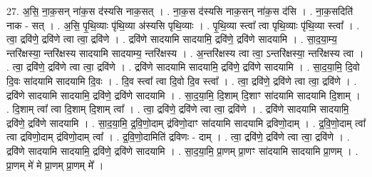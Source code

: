 \documentclass[17pt]{extarticle}
\begin{document}
27. अ॒सि॒ ना॒क॒सन् ना॑क॒स द॑स्यसि नाक॒सत् । . ना॒क॒स द॑स्यसि नाक॒सन् ना॑क॒स द॑सि । . ना॒क॒सदिति॑ नाक - सत् । . अ॒सि॒ पृ॒थि॒व्याः पृ॑थि॒व्या अ॑स्यसि पृथि॒व्याः । . पृ॒थि॒व्या स्त्वा᳚ त्वा पृथि॒व्याः पृ॑थि॒व्या स्त्वा᳚ । . त्वा॒ द्रवि॑णे॒ द्रवि॑णे त्वा त्वा॒ द्रवि॑णे । . द्रवि॑णे सादयामि सादयामि॒ द्रवि॑णे॒ द्रवि॑णे सादयामि । . सा॒द॒या॒म्य॒ न्तरि॑क्षस्या॒ न्तरि॑क्षस्य सादयामि सादयाम्य॒ न्तरि॑क्षस्य । . अ॒न्तरि॑क्षस्य त्वा त्वा॒ ऽन्तरि॑क्षस्या॒ न्तरि॑क्षस्य त्वा । . त्वा॒ द्रवि॑णे॒ द्रवि॑णे त्वा त्वा॒ द्रवि॑णे । . द्रवि॑णे सादयामि सादयामि॒ द्रवि॑णे॒ द्रवि॑णे सादयामि । . सा॒द॒या॒मि॒ दि॒वो दि॒वः सा॑दयामि सादयामि दि॒वः । . दि॒व स्त्वा᳚ त्वा दि॒वो दि॒व स्त्वा᳚ । . त्वा॒ द्रवि॑णे॒ द्रवि॑णे त्वा त्वा॒ द्रवि॑णे । . द्रवि॑णे सादयामि सादयामि॒ द्रवि॑णे॒ द्रवि॑णे सादयामि । . सा॒द॒या॒मि॒ दि॒शाम् दि॒शाꣳ सा॑दयामि सादयामि दि॒शाम् । . दि॒शाम् त्वा᳚ त्वा दि॒शाम् दि॒शाम् त्वा᳚ । . त्वा॒ द्रवि॑णे॒ द्रवि॑णे त्वा त्वा॒ द्रवि॑णे । . द्रवि॑णे सादयामि सादयामि॒ द्रवि॑णे॒ द्रवि॑णे सादयामि । . सा॒द॒या॒मि॒ द्र॒वि॒णो॒दाम् द्र॑विणो॒दाꣳ सा॑दयामि सादयामि द्रविणो॒दाम् । . द्र॒वि॒णो॒दाम् त्वा᳚ त्वा द्रविणो॒दाम् द्र॑विणो॒दाम् त्वा᳚ । . द्र॒वि॒णो॒दामिति॑ द्रविणः - दाम् । . त्वा॒ द्रवि॑णे॒ द्रवि॑णे त्वा त्वा॒ द्रवि॑णे । . द्रवि॑णे सादयामि सादयामि॒ द्रवि॑णे॒ द्रवि॑णे सादयामि । . सा॒द॒या॒मि॒ प्रा॒णम् प्रा॒णꣳ सा॑दयामि सादयामि प्रा॒णम् । . प्रा॒णम् मे॑ मे प्रा॒णम् प्रा॒णम् मे᳚ । \newline
\end{document}
